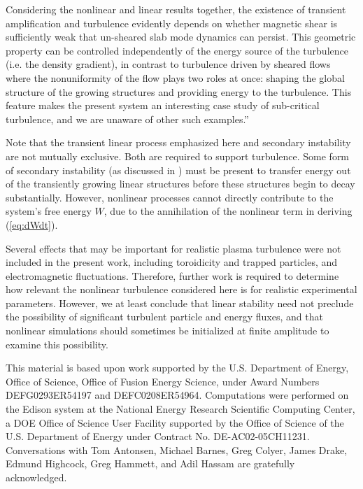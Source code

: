 \documentclass[12pt,superscriptaddress]{revtex4}
\begin{document}
Considering the nonlinear and linear results together, the existence of transient amplification and
turbulence evidently depends on whether magnetic shear is sufficiently weak that un-sheared slab mode
dynamics can persist.
This geometric property can be controlled independently of the energy source of the turbulence (i.e. the density gradient),
in contrast to turbulence driven by sheared flows where the nonuniformity of the flow plays two roles at once:
shaping the global structure of the growing structures and providing energy to the turbulence.
This feature makes the present system an interesting case study of sub-critical turbulence, and we are unaware of other such examples.”

Note that the transient linear process emphasized here and secondary instability are not mutually
exclusive. Both are required to support turbulence.
Some form of secondary instability (as discussed in \cite{Drake}) must be present to transfer energy out of the transiently growing linear
structures before these structures begin to decay substantially. However, nonlinear processes cannot
directly contribute to the system's free energy $W$, due to the annihilation of the nonlinear term
in deriving (\ref{eq:dWdt}).

Several effects that may be important for realistic plasma turbulence
were not included in the present work, including toroidicity and trapped particles,
and electromagnetic fluctuations.
Therefore, further work is required to determine how relevant the nonlinear turbulence considered here
is for realistic experimental parameters.  However, we at least conclude that linear stability
need not preclude the possibility of significant turbulent particle and energy fluxes,
and that nonlinear simulations should sometimes be initialized at finite amplitude to examine this possibility.

\begin{acknowledgments}
This material is based upon work supported by the
U.S. Department of Energy, Office of Science, Office of Fusion Energy Science,
under Award Numbers DEFG0293ER54197 and DEFC0208ER54964.
Computations were performed on the Edison system at
the National Energy Research Scientific Computing Center, a DOE Office of Science User Facility supported by the Office of Science of the U.S. Department of Energy under Contract No. DE-AC02-05CH11231.
Conversations with
Tom Antonsen, Michael Barnes, Greg Colyer, James Drake, Edmund Highcock, Greg Hammett, and Adil Hassam
are gratefully acknowledged.
\end{acknowledgments}
\end{document}
